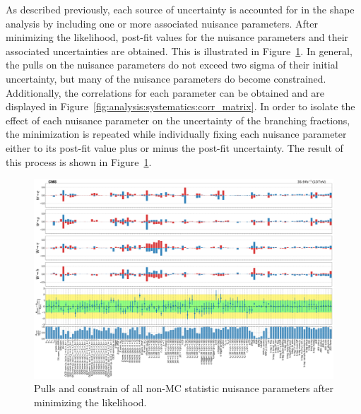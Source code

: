 As described previously, each source of uncertainty is accounted for in
the shape analysis by including one or more associated nuisance
parameters.  After minimizing the likelihood, post-fit values for the
nuisance parameters and their associated uncertainties are obtained.
This is illustrated in Figure~\ref{fig:analysis:systematics:pulls_all}.  In general, the
pulls on the nuisance parameters do not exceed two sigma of their
initial uncertainty, but many of the nuisance parameters do become
constrained.  Additionally, the correlations for each parameter can be
obtained and are displayed in Figure~\ref{fig:analysis:systematics:corr_matrix}.  In order to
isolate the effect of each nuisance parameter on the uncertainty of the 
branching fractions, the minimization is repeated while individually fixing each
nuisance parameter either to its post-fit value plus or minus the
post-fit uncertainty.  The result of this process is shown in
Figure~\ref{fig:analysis:systematics:pulls_all}.

\begin{figure}
    \centering
    \includegraphics[width=\textwidth]{chapters/Analysis/sectionSystematics/figures/pulls_impacts_final.pdf}
    \caption{Pulls and constrain of all non-MC statistic nuisance
        parameters after minimizing the likelihood.}
    \label{fig:analysis:systematics:pulls_all}
\end{figure}

